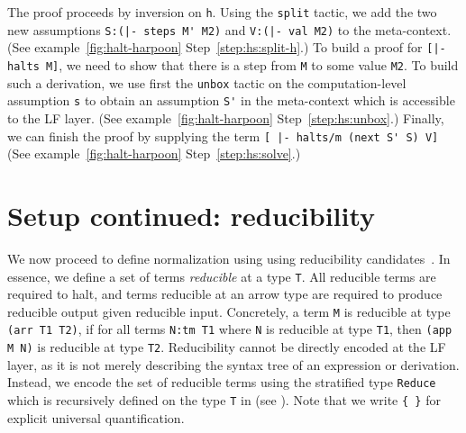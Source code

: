 The proof proceeds by inversion on \lstinline!h!.
Using the \lstinline!split! tactic, we add the two new
assumptions \lstinline!S:(|- steps M' M2)! and
\lstinline!V:(|- val M2)!
to the meta-context. %
(See \Harpoon{} example~\ref{fig:halt-harpoon} Step~\ref{step:hs:split-h}.) %
%
To build a proof for \lstinline![|- halts M]!, we need to show that
there is a step from \lstinline!M! to some value \lstinline!M2!. To
build such a derivation, %
we use first the \lstinline!unbox! tactic on the computation-level
assumption \lstinline!s! to obtain an assumption \lstinline!S'! in the
meta-context which is accessible to the LF layer.
(See \Harpoon{} example~\ref{fig:halt-harpoon} Step~\ref{step:hs:unbox}.)
%
%
Finally, we can finish the proof by supplying the term
\lstinline![ |- halts/m (next S' S) V]!
(See \Harpoon{} example~\ref{fig:halt-harpoon} Step~\ref{step:hs:solve}.)


\section{Setup continued: reducibility}
\label{sec:setup-2}
We now proceed to define normalization using using reducibility
candidates~\cite{proofs-and-types}.
In essence, we define a set of terms \emph{reducible} at a type \lstinline!T!. %
All reducible terms are required to halt, and terms reducible at an arrow type
are required to produce reducible output given reducible input.
Concretely,  a term
\lstinline!M! is reducible at type \lstinline!(arr T1 T2)!,
 if for all
terms \lstinline!N:tm T1! where \lstinline!N! is reducible at type
\lstinline!T1!, then \lstinline!(app M N)! is reducible at type \lstinline!T2!.
Reducibility cannot be directly encoded at the LF layer, as it is not
merely describing the syntax tree of an expression or derivation.
Instead, we encode the set of reducible terms using the stratified
type \lstinline!Reduce! which is recursively defined on the type
\lstinline!T! in \Beluga{} (see \cite{JacobRao:stratified2018}). Note
that we write \lstinline!{ }! for explicit universal quantification.

